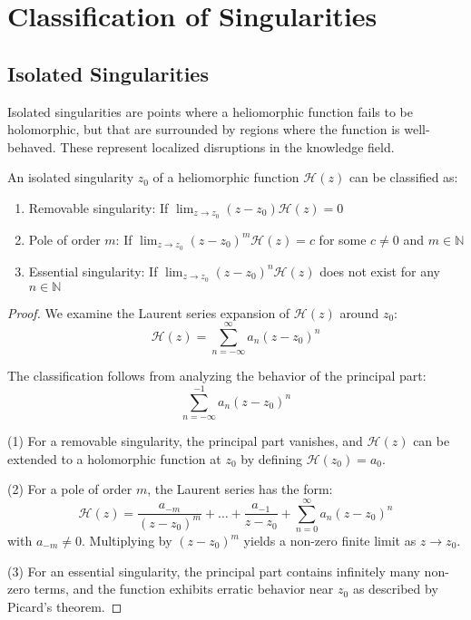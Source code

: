 \section{Classification of Singularities}

\subsection{Isolated Singularities}

Isolated singularities are points where a heliomorphic function fails to be holomorphic, but that are surrounded by regions where the function is well-behaved. These represent localized disruptions in the knowledge field.

\begin{theorem}
An isolated singularity $z_0$ of a heliomorphic function $\mathcal{H}(z)$ can be classified as:
\begin{enumerate}
    \item Removable singularity: If $\lim_{z \to z_0} (z-z_0)\mathcal{H}(z) = 0$
    \item Pole of order $m$: If $\lim_{z \to z_0} (z-z_0)^m\mathcal{H}(z) = c$ for some $c \neq 0$ and $m \in \mathbb{N}$
    \item Essential singularity: If $\lim_{z \to z_0} (z-z_0)^n\mathcal{H}(z)$ does not exist for any $n \in \mathbb{N}$
\end{enumerate}
\end{theorem}

\begin{proof}
We examine the Laurent series expansion of $\mathcal{H}(z)$ around $z_0$:
\begin{equation}
\mathcal{H}(z) = \sum_{n=-\infty}^{\infty} a_n (z-z_0)^n
\end{equation}

The classification follows from analyzing the behavior of the principal part:
\begin{equation}
\sum_{n=-\infty}^{-1} a_n (z-z_0)^n
\end{equation}

(1) For a removable singularity, the principal part vanishes, and $\mathcal{H}(z)$ can be extended to a holomorphic function at $z_0$ by defining $\mathcal{H}(z_0) = a_0$.

(2) For a pole of order $m$, the Laurent series has the form:
\begin{equation}
\mathcal{H}(z) = \frac{a_{-m}}{(z-z_0)^m} + \ldots + \frac{a_{-1}}{z-z_0} + \sum_{n=0}^{\infty} a_n (z-z_0)^n
\end{equation}
with $a_{-m} \neq 0$. Multiplying by $(z-z_0)^m$ yields a non-zero finite limit as $z \to z_0$.

(3) For an essential singularity, the principal part contains infinitely many non-zero terms, and the function exhibits erratic behavior near $z_0$ as described by Picard's theorem.
\end{proof}

